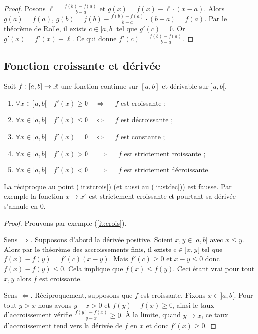 \documentclass[class=report,crop=false]{standalone}
\begin{document}
\begin{proof}
Posons $\ell = \frac{f(b)-f(a)}{b-a}$ et $g(x) = f(x) - \ell \cdot (x-a)$.
Alors $g(a)=f(a)$, $g(b)=f(b)- \frac{f(b)-f(a)}{b-a} \cdot (b-a) = f(a)$.
Par le théorème de Rolle, il existe $c \in ]a,b[$ tel que $g'(c) =0$.
Or $g'(x) = f'(x) - \ell$.
Ce qui donne $f'(c)= \frac{f(b)-f(a)}{b-a}$.
\end{proof}


\subsection{Fonction croissante et dérivée}

\begin{corollaire}
Soit $f:[a,b] \to \mathbb{R}$ une fonction continue sur $[a,b]$ et dérivable sur $]a,b[$.
\begin{enumerate}
  \item \label{it:crois}$\forall x \in ]a,b[ \quad f'(x) \ge 0 \quad \iff \quad$ $f$ est croissante ;
  \item $\forall x \in ]a,b[ \quad f'(x) \le 0 \quad \iff \quad$ $f$ est décroissante ;
  \item  $\forall x \in ]a,b[ \quad f'(x) = 0 \quad \iff \quad$ $f$ est constante ;
  \item \label{it:stcrois} $\forall x \in ]a,b[ \quad f'(x) > 0 \quad \implies \quad$ $f$ est strictement croissante ;
  \item \label{it:stdec} $\forall x \in ]a,b[ \quad f'(x) < 0 \quad \implies \quad$ $f$ est strictement décroissante.
\end{enumerate}
\end{corollaire}

\begin{remarque*}
La réciproque au point (\ref{it:stcrois}) (et aussi au  (\ref{it:stdec})) est fausse.
Par exemple la fonction $x \mapsto x^3$ est strictement croissante et pourtant sa dérivée s'annule en $0$.
\end{remarque*}


\begin{proof}
Prouvons par exemple (\ref{it:crois}).

Sens $\Longrightarrow$. \quad  Supposons d'abord la dérivée positive.
Soient $x,y \in ]a,b[$ avec $x\le y$. Alors
par le théorème des accroissements finis, il existe $c\in]x,y[$ tel que
$f(x)-f(y) = f'(c) (x-y)$. Mais $f'(c) \ge 0$ et $x-y \le 0$ donc $f(x)-f(y) \le 0$.
Cela implique que $f(x) \le f(y)$. Ceci étant vrai pour tout $x,y$ alors $f$ est croissante.

\medskip

Sens $\Longleftarrow$. \quad Réciproquement, supposons que $f$ est croissante. Fixons $x\in]a,b[$.
Pour tout $y > x$ nous avons $y-x>0$ et $f(y)-f(x)\ge 0$, ainsi
le taux d'accroissement vérifie $\frac{f(y)-f(x)}{y-x}\ge 0$. \`A la limite,
quand $y \to x$, ce taux d'accroissement
tend vers la dérivée de $f$ en $x$ et donc $f'(x) \ge 0$.
\end{proof}
\end{document}
